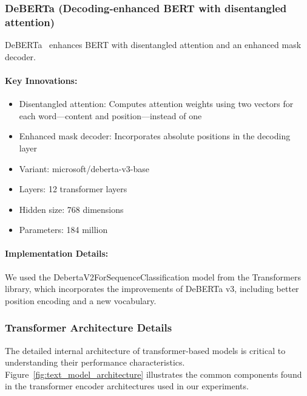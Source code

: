 \documentclass[12pt]{article}
\begin{document}
\subsubsection{DeBERTa (Decoding-enhanced BERT with disentangled attention)}
DeBERTa~\cite{he2020deberta} enhances BERT with disentangled attention and an enhanced mask decoder.

\paragraph{Key Innovations:}
\begin{itemize}
    \item Disentangled attention: Computes attention weights using two vectors for each word—content and position—instead of one
    \item Enhanced mask decoder: Incorporates absolute positions in the decoding layer
    \item Variant: microsoft/deberta-v3-base
    \item Layers: 12 transformer layers
    \item Hidden size: 768 dimensions
    \item Parameters: 184 million
\end{itemize}

\paragraph{Implementation Details:}
We used the DebertaV2ForSequenceClassification model from the Transformers library, which incorporates the improvements of DeBERTa v3, including better position encoding and a new vocabulary.

\subsubsection{Transformer Architecture Details}
The detailed internal architecture of transformer-based models is critical to understanding their performance characteristics. Figure~\ref{fig:text_model_architecture} illustrates the common components found in the transformer encoder architectures used in our experiments.
\end{document}
